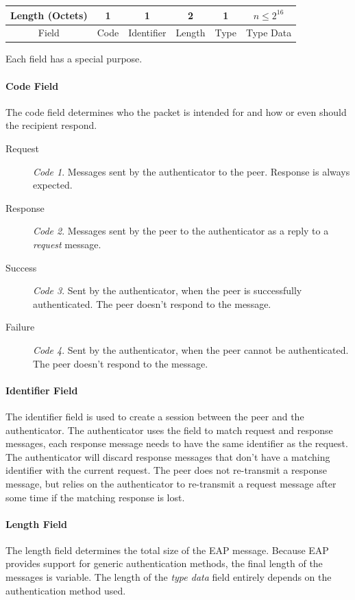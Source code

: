 \begin{center}
	\begin{tabular}{|c|c|c|c|c|c|}
		\hline
		Length (Octets) & 1 & 1 & 2 & 1 & $n \le 2^{16}$\\
		\hline
		Field & Code & Identifier & Length & Type & Type Data\\
		\hline
	\end{tabular}
\end{center}

Each field has a special purpose.

\paragraph{Code Field}
The code field determines who the packet is intended for and how or even should the recipient respond.

\begin{description}
	\item[Request]\textit{Code 1}. Messages sent by the authenticator to the peer. Response is always expected.
	\item[Response]\textit{Code 2}. Messages sent by the peer to the authenticator as a reply to a \textit{request} message.
	\item[Success]\textit{Code 3}. Sent by the authenticator, when the peer is successfully authenticated. The peer doesn't respond to the message.
	\item[Failure]\textit{Code 4}. Sent by the authenticator, when the peer cannot be authenticated. The peer doesn't respond to the message.
\end{description}

\paragraph{Identifier Field}
The identifier field is used to create a session between the peer and the authenticator.
The authenticator uses the field to match request and response messages, each response message needs to have the same identifier as the request.
The authenticator will discard response messages that don't have a matching identifier with the current request.
The peer does not re-transmit a response message, but relies on the authenticator to re-transmit a request message after some time if the matching response is lost.

\paragraph{Length Field}
The length field determines the total size of the EAP message. Because EAP provides support for generic authentication methods, the final length of the messages is variable.
The length of the \textit{type data} field entirely depends on the authentication method used.

